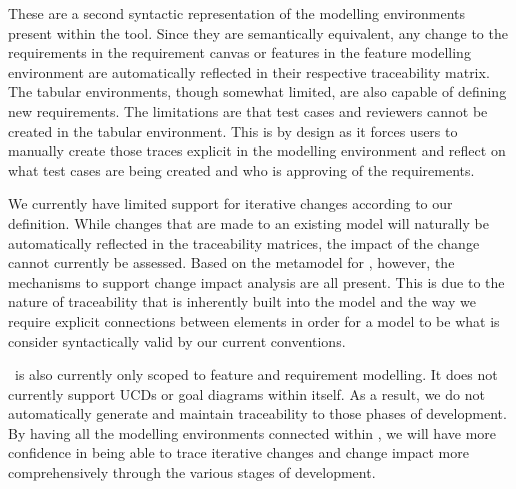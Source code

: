 These are a second syntactic representation of the modelling environments present within the tool. Since they are semantically equivalent, any change to the requirements in the requirement canvas or features in the feature modelling environment are automatically reflected in their respective traceability matrix. The tabular environments, though somewhat limited, are also capable of defining new requirements. The limitations are that test cases and reviewers cannot be created in the tabular environment. This is by design as it forces users to manually create those traces explicit in the modelling environment and reflect on what test cases are being created and who is approving of the requirements.

We currently have limited support for iterative changes according to our definition. While changes that are made to an existing model will naturally be automatically reflected in the traceability matrices, the impact of the change cannot currently be assessed. Based on the metamodel for \tool, however, the mechanisms to support change impact analysis are all present. This is due to the nature of traceability that is inherently built into the model and the way we require explicit connections between elements in order for a model to be what is consider syntactically valid by our current conventions. 

\tool\ is also currently only scoped to feature and requirement modelling. It does not currently support \ac{UCD}s or goal diagrams within itself. As a result, we do not automatically generate and maintain traceability to those phases of development. By having all the modelling environments connected within \tool, we will have more confidence in being able to trace iterative changes and change impact more comprehensively through the various stages of development. 

%
%
%
%
